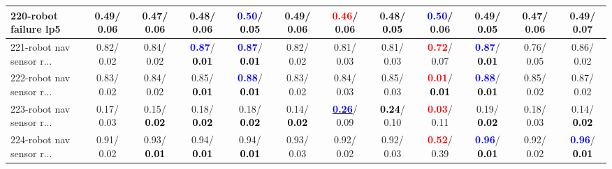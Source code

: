 \begin{table}[h]
\begin{center}
{\begin{tabular}{lc|c|c|c|c|c|c|c|c|c|c}
220-robot failure lp5 &   0.49/  0.06 &   0.47/  0.06 &   0.48/  0.06 & \textcolor{blue}{\textbf{  0.50}}/\textcolor{black}{\textbf{  0.05}} &   0.49/  0.06 & \textcolor{red}{\textbf{  0.46}}/  0.06 &   0.48/\textcolor{black}{\textbf{  0.05}} & \textcolor{blue}{\textbf{  0.50}}/  0.06 &   0.49/\textcolor{black}{\textbf{  0.05}} &   0.47/  0.06 &   0.49/  0.07 \\ \hline
221-robot nav sensor r... &   0.82/  0.02 &   0.84/  0.02 & \textcolor{blue}{\textbf{  0.87}}/\textcolor{black}{\textbf{  0.01}} & \textcolor{blue}{\textbf{  0.87}}/\textcolor{black}{\textbf{  0.01}} &   0.82/  0.02 &   0.81/  0.03 &   0.81/  0.03 & \textcolor{red}{\textbf{  0.72}}/  0.07 & \textcolor{blue}{\textbf{  0.87}}/\textcolor{black}{\textbf{  0.01}} &   0.76/  0.05 &   0.86/  0.02 \\
222-robot nav sensor r... &   0.83/  0.02 &   0.84/  0.02 &   0.85/\textcolor{black}{\textbf{  0.01}} & \textcolor{blue}{\textbf{  0.88}}/\textcolor{black}{\textbf{  0.01}} &   0.83/  0.02 &   0.84/  0.03 &   0.85/  0.03 & \textcolor{red}{\textbf{  0.01}}/\textcolor{black}{\textbf{  0.01}} & \textcolor{blue}{\textbf{  0.88}}/\textcolor{black}{\textbf{  0.01}} &   0.85/  0.02 &   0.87/  0.02 \\
223-robot nav sensor r... &   0.17/  0.03 &   0.15/\textcolor{black}{\textbf{  0.02}} &   0.18/\textcolor{black}{\textbf{  0.02}} &   0.18/\textcolor{black}{\textbf{  0.02}} &   0.14/\textcolor{black}{\textbf{  0.02}} & \underline{\textcolor{blue}{\textbf{  0.26}}}/  0.09 & \textcolor{black}{\textbf{  0.24}}/  0.10 & \textcolor{red}{\textbf{  0.03}}/  0.11 &   0.19/\textcolor{black}{\textbf{  0.02}} &   0.18/  0.03 &   0.14/\textcolor{black}{\textbf{  0.02}} \\
224-robot nav sensor r... &   0.91/  0.02 &   0.93/\textcolor{black}{\textbf{  0.01}} &   0.94/\textcolor{black}{\textbf{  0.01}} &   0.94/\textcolor{black}{\textbf{  0.01}} &   0.93/  0.03 &   0.92/  0.02 &   0.92/  0.03 & \textcolor{red}{\textbf{  0.52}}/  0.39 & \textcolor{blue}{\textbf{  0.96}}/\textcolor{black}{\textbf{  0.01}} &   0.92/  0.02 & \textcolor{blue}{\textbf{  0.96}}/\textcolor{black}{\textbf{  0.01}} \\\end{tabular}}\label{stratsALCKappa6Allalla}
\end{center}
\end{table}

